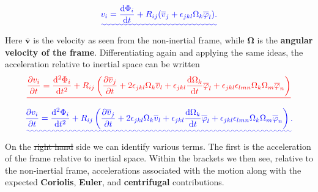\documentclass[a4paper,12pt]{paper}
\providecommand{\DIFadd}[1]{{\protect\color{blue}\uwave{#1}}} %
\providecommand{\DIFdel}[1]{{\protect\color{red}\sout{#1}}}                      %
\providecommand{\DIFaddbegin}{} %
\providecommand{\DIFaddend}{} %
\providecommand{\DIFdelbegin}{} %
\providecommand{\DIFdelend}{} %
\begin{document}
\DIFdelend \DIFaddbegin \begin{equation}
\DIFadd{v_{i}=\frac{\ddns \Phi_{i}}{\ddns t}+R_{ij}(\overline{v}_{j}+\epsilon_{jkl}\Omega_{k}\overline{\varphi}_{l}).
\label{eq:33}
}\end{equation}\DIFaddend 
Here $\overline{\mathbf{v}}$ is the velocity as seen from the non-inertial frame, while \DIFdelbegin \DIFdel{$\mathbf{\Omega}$ }\DIFdelend \DIFaddbegin \DIFadd{$\bm{\Omega}$ }\DIFaddend is the 
\textbf{angular velocity of the frame}. Differentiating again and applying the same ideas, the acceleration relative 
to inertial space can be written
\DIFdelbegin \begin{displaymath}
\DIFdel{\frac{\partial v_{i}}{\partial t}=\frac{\ddns ^{2}\Phi_{i}}{\ddns t^{2}}+R_{ij}\left(\frac{\partial\overline{v}_{j}}{\partial t}+2\epsilon_{jkl}\Omega_{k}\overline{v}_{l}+\epsilon_{jkl}\frac{\ddns \Omega_{k}}{\ddns t}\overline{\varphi}_{l}+\epsilon_{jkl}\epsilon_{lmn}\Omega_{k}\Omega_{m}\overline{\varphi}_{n}\right)
}\end{displaymath}%
\DIFdelend \DIFaddbegin \begin{equation}
\DIFadd{\frac{\partial v_{i}}{\partial t}=\frac{\ddns ^{2}\Phi_{i}}{\ddns t^{2}}+R_{ij}\left(\frac{\partial\overline{v}_{j}}{\partial t}+2\epsilon_{jkl}\Omega_{k}\overline{v}_{l}+\epsilon_{jkl}\frac{\ddns \Omega_{k}}{\ddns t}\overline{\varphi}_{l}+\epsilon_{jkl}\epsilon_{lmn}\Omega_{k}\Omega_{m}\overline{\varphi}_{n}\right).
\label{eq:34}
}\end{equation}\DIFaddend 
On the \DIFdelbegin \DIFdel{right hand }\DIFdelend \DIFaddbegin \DIFadd{right-hand }\DIFaddend side we can identify various terms. The first is the acceleration of the frame relative to 
inertial space. Within the brackets we then see, relative to the non-inertial frame, accelerations associated 
with the motion along with the expected \textbf{Coriolis}, \textbf{Euler}, and \textbf{centrifugal} contributions.
\end{document}
